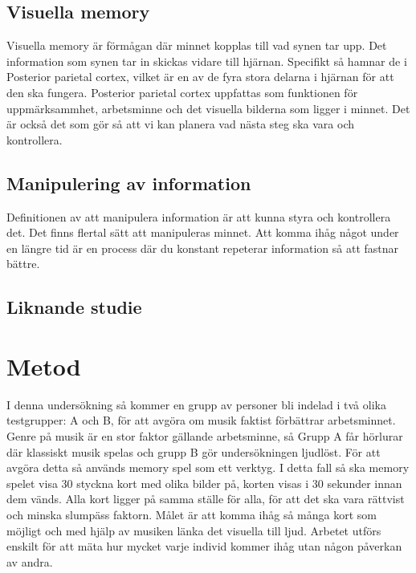 \documentclass[11p]{article}
\begin{document}
    \subsection{Visuella memory}
    Visuella memory är förmågan där minnet kopplas till vad synen tar upp.
    Det information som synen tar in skickas vidare till hjärnan.
    Specifikt så hamnar de i Posterior parietal cortex, vilket är en av de fyra stora delarna i hjärnan för att den ska fungera.
    Posterior parietal cortex uppfattas som funktionen för uppmärksammhet, arbetsminne och det visuella bilderna som ligger i minnet.
    Det är också det som gör så att vi kan planera vad nästa steg ska vara och kontrollera.
    \textcite{Capacitylimit}


    \subsection{Manipulering av information}
    Definitionen av att manipulera information är att kunna styra och kontrollera det.
    Det finns flertal sätt att manipuleras minnet.
    Att komma ihåg något under en längre tid är en process där du konstant repeterar information så att fastnar bättre.




    \subsection{Liknande studie}




    \section{Metod}
    I denna undersökning så kommer en grupp av personer bli indelad i två olika testgrupper: A och B, för att avgöra om musik faktist förbättrar arbetsminnet.
    Genre på musik är en stor faktor gällande arbetsminne, så Grupp A får hörlurar där klassiskt musik spelas och grupp B gör undersökningen ljudlöst.
    \newline För att avgöra detta så används memory spel som ett verktyg.
    I detta fall så ska memory spelet visa 30 styckna kort med olika bilder på, korten visas i 30 sekunder innan dem vänds.
    \newline Alla kort ligger på samma ställe för alla, för att det ska vara rättvist och minska slumpäss faktorn.
    Målet är att komma ihåg så många kort som möjligt och med hjälp av musiken länka det visuella till ljud.
    Arbetet utförs enskilt för att mäta hur mycket varje individ kommer ihåg utan någon påverkan av andra.
\end{document}

